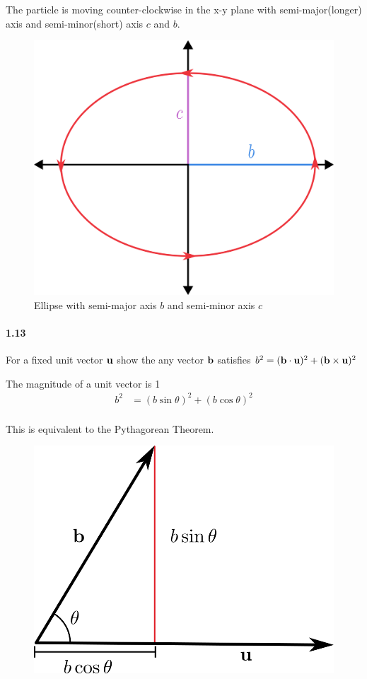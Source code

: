 \documentclass[../problems.tex]{subfiles}
\begin{document}
The particle is moving counter-clockwise in the x-y plane with semi-major(longer) axis and 
semi-minor(short) axis $c$ and $b$.

\begin{figure}[ht]
    \centering
    \includegraphics[scale=0.8]{fig1_11.png}
    \caption{Ellipse with semi-major axis $b$ and semi-minor axis $c$}
\end{figure}

\newpage
\paragraph{1.13}
For a fixed unit vector $\mathbf{u}$ show the any vector $\mathbf{b}$ satisfies 
$b^2 = (\mathbf{b}\cdot \mathbf{u})^2 + (\mathbf{b}\times \mathbf{u})^2$
\barh

The magnitude of a unit vector is 1
\begin{align*}
    b^2 &= (b \sin{\theta})^2 + (b \cos{\theta})^2 \\
\end{align*}

This is equivalent to the Pythagorean Theorem.
\begin{figure}[ht]
    \centering
    \includegraphics[scale=0.9]{fig1_13.png}
    \caption{}
\end{figure}
\end{document}
